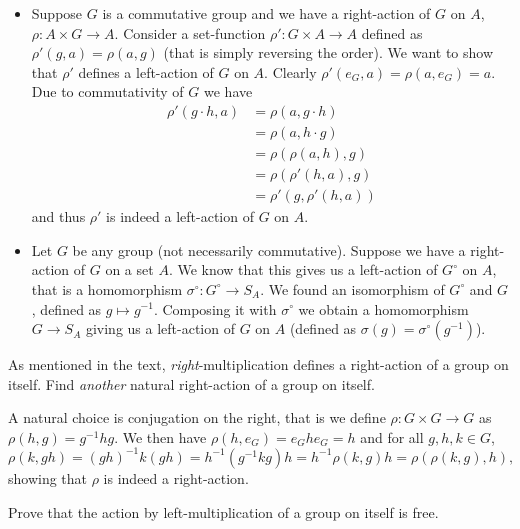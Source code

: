 \begin{solution}
\begin{itemize}
		\item Suppose $G$ is a commutative group and we have a right-action of $G$ on $A$, $\rho: A \times G \to A$. Consider a set-function $\rho': G \times A \to A$ defined as $\rho'(g, a) = \rho(a, g)$ (that is simply reversing the order). We want to show that $\rho'$ defines a left-action of $G$ on $A$. Clearly $\rho'(e_G, a) = \rho(a, e_G) = a$. Due to commutativity of $G$ we have
		\[
			\begin{aligned}
				\rho'(g \cdot h, a) &= \rho(a, g \cdot h)\\
				&= \rho(a, h \cdot g)\\
				&= \rho(\rho(a, h), g)\\
				&= \rho(\rho'(h, a), g)\\
				&= \rho'(g, \rho'(h, a))
			\end{aligned}
		\] 
		and thus $\rho'$ is indeed a left-action of $G$ on $A$.
		
		\item Let $G$ be any group (not necessarily commutative). Suppose we have a right-action of $G$ on a set $A$. We know that this gives us a left-action of $G^{\circ}$ on $A$, that is a homomorphism $\sigma^{\circ}: G^{\circ} \to S_A$. We found an isomorphism of $G^{\circ}$ and $G$, defined as $g \mapsto g^{-1}$. Composing it with $\sigma^{\circ}$ we obtain a homomorphism $G \to S_A$ giving us a left-action of $G$ on $A$ (defined as $\sigma(g) = \sigma^{\circ}(g^{-1})$). \qedhere
	\end{itemize}
\end{solution}

\begin{problem}
	As mentioned in the text, \emph{right}-multiplication defines a right-action of a group on itself. Find \emph{another} natural right-action of a group on itself.
\end{problem}

\begin{solution}
	A natural choice is conjugation on the right, that is we define $\rho: G \times G \to G$ as $\rho(h, g) = g^{-1}hg$. We then have $\rho(h, e_G) = e_G h e_G = h$ and for all $g, h, k \in G$,
	\[
		\rho(k, gh) = (gh)^{-1}k(gh) = h^{-1}(g^{-1}kg)h = h^{-1} \rho(k, g) h = \rho(\rho(k, g), h) \text{,}
	\]
	showing that $\rho$ is indeed a right-action.
\end{solution}

\begin{problem}
	Prove that the action by left-multiplication of a group on itself is free.
\end{problem}

